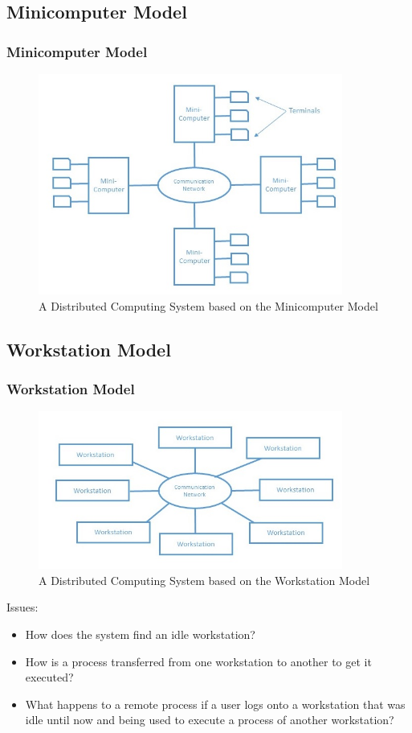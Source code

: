 \documentclass{beamer}
\begin{document}
\subsection{Minicomputer Model}
\begin{frame}
    \frametitle{Minicomputer Model}
    \begin{figure}
        \centering
        \includegraphics[width=10cm]{miniComputerModel}
        \caption{A Distributed Computing System based on the Minicomputer Model}\label{minicomputermodel}
        \end{figure}
        \vspace{3cm}
\end{frame}



\subsection{Workstation Model}
\begin{frame}
    \frametitle{Workstation Model}
\begin{figure}
  \centering
  \includegraphics[width=10cm]{workStationModel}
  \caption{A Distributed Computing System based on the Workstation Model}\label{workstationmodel}
\end{figure}

    Issues:
    \begin{itemize}
      \item {How does the system find an idle workstation?}
      \item {How is a process transferred from one workstation to another to get it executed?}
      \item {What happens to a remote process if a user logs onto a workstation that was idle until now and being used to execute a process of another workstation?}
    \end{itemize}
    \vspace{5cm}
\end{frame}
\end{document}

